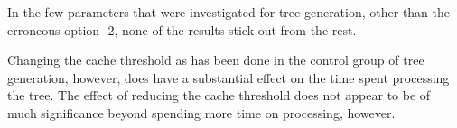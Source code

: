 In the few parameters that were investigated for tree generation, other than the erroneous option -2, none of the results stick out from the rest.

Changing the cache threshold as has been done in the control group of tree generation, however, does have a substantial effect on the time spent processing the tree.
The effect of reducing the cache threshold does not appear to be of much significance beyond spending more time on processing, however.

